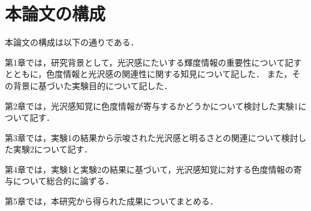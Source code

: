     \section{本論文の構成}
        本論文の構成は以下の通りである．

        第1章では，研究背景として，光沢感にたいする輝度情報の重要性について記すとともに，色度情報と光沢感の関連性に関する知見について記した．
        また，その背景に基づいた実験目的について記した．

        第2章では，光沢感知覚に色度情報が寄与するかどうかについて検討した実験1について記す．

        第3章では，実験1の結果から示唆された光沢感と明るさとの関連について検討した実験2について記す．

        第4章では，実験1と実験2の結果に基づいて，光沢感知覚に対する色度情報の寄与について総合的に論ずる．

        第5章では，本研究から得られた成果についてまとめる．

    \newpage